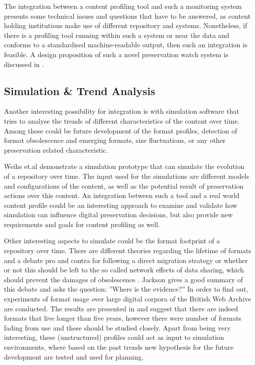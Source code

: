 The integration between a content profiling tool and such a monitoring system presents some technical issues and questions that have to be answered, as content holding institutions make use of different repository and systems. Nonetheless, if there is a profiling tool running within such a system or near the data and conforms to a standardised machine-readable output, then such an integration is feasible. A design proposition of such a novel preservation watch system is discussed in \cite{duretec:2012:watch, FariaPDBFR12}.



\subsection{Simulation \& Trend Analysis}
Another interesting possibility for integration is with simulation software that tries to analyse the trends of different characteristics of the content over time. Among these could be future development of the format profiles, detection of format obsolescence and emerging formats, size fluctuations, or any other preservation related characteristic.

Weihs et.al demonstrate a simulation prototype \cite{TUW-206758} that can simulate the evolution of a repository over time. The input used for the simulations are different models and configurations of the content, as well as the potential result of preservation actions over this content. An integration between such a tool and a real world content profile could be an interesting approach to examine and validate how simulation can influence digital preservation decisions, but also provide new requirements and goals for content profiling  as well.

Other interesting aspects to simulate could be the format footprint of a repository over time. There are different theories regarding the lifetime of formats and a debate pro and contra for following a direct migration strategy or whether or not this should be left to the so called network effects of data sharing, which should prevent the damages of obsolescence \cite{Rosenthal:1January2010:0737-8831:195}. Jackson gives a good summary of this debate and asks the question: ''Where is the evidence?'' In order to find out, experiments of format usage over large digital corpora of the British Web Archive are conducted. The results are presented in \cite{journals/corr/abs-1210-1714} and suggest that there are indeed formats that live longer than five years, however there were number of formats fading from use and these should be studied closely. Apart from being very interesting, these (unstructured) profiles could act as input to simulation environments, where based on the past trends new hypothesis for the future development are tested and used for planning.

